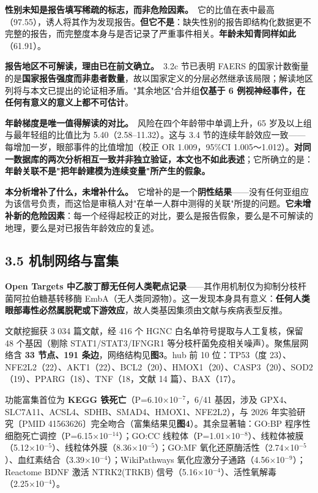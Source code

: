 \documentclass[UTF8,fontset=windows,11pt]{ctexart}
\begin{document}
\textbf{性别未知是报告填写稀疏的标志，而非危险因素。}\ 它的比值在表中最高（97.55），诱人将其作为发现报告。\textbf{但它不是}：缺失性别的报告即结构化数据更不完整的报告，而完整度本身与是否记录了严重事件相关。\textbf{年龄未知青同样如此}（61.91）。

\textbf{报告地区不可解读，理由已在前文确立。}\ 3.2c 节已表明 FAERS 的国家计数衡量的是\textbf{国家报告强度而非患者数量}，故以国家定义的分层必然继承该局限；解读地区列将与本文已提出的论证相矛盾。"其余地区"合并组\textbf{仅基于 6 例视神经事件，在任何有意义的意义上都不可估计}。

\textbf{年龄梯度是唯一值得解读的对比。}\ 风险在四个年龄带中单调上升，65 岁及以上组与最年轻组的比值比为 5.40（2.58–11.32）。这与 3.4 节的连续年龄效应一致——每增加一岁，眼部事件的比值增加（校正 OR 1.009，95\%CI 1.005～1.012）。\textbf{对同一数据库的两次分析相互一致并非独立验证，本文也不如此表述}；它所确立的是：\textbf{年龄关联不是"把年龄建模为连续变量"所产生的假象。}

\textbf{本分析增补了什么，未增补什么。}\ 它增补的是一个\textbf{阴性结果}——没有任何亚组应为该信号负责，而这恰是审稿人对"在单一人群中测得的关联"所提的问题。\textbf{它未增补新的危险因素}：每一个经得起校正的对比，要么是报告假象，要么是不可解读的地理，要么是对已报告年龄效应的复述。

\subsection{3.5 机制网络与富集}

\textbf{Open Targets 中乙胺丁醇无任何人类靶点记录}——其作用机制仅为抑制分枝杆菌阿拉伯糖基转移酶 EmbA（无人类同源物）。这一发现本身具有意义：\textbf{任何人类眼部毒性必然属脱靶或下游效应}，故人类基因集须由文献与疾病表型反推。

文献挖掘获 3 034 篇文献，经 416 个 HGNC 白名单符号提取与人工复核，保留 48 个基因（剔除 STAT1/STAT3/IFNGR1 等分枝杆菌免疫相关噪声）。聚焦层网络含 \textbf{33 节点、191 条边}，网络结构见\textbf{图3}。hub 前 10 位：TP53（度 23）、NFE2L2（22）、AKT1（22）、BCL2（20）、HMOX1（20）、CASP3（20）、SOD2（19）、PPARG（18）、TNF（18，文献 14 篇）、BAX（17）。

功能富集首位为 \textbf{KEGG 铁死亡}（P=6.10×10$^{-7}$，6/41 基因，涉及 GPX4、SLC7A11、ACSL4、SDHB、SMAD4、HMOX1、NFE2L2），与 2026 年实验研究〔PMID 41563626〕完全吻合（富集结果见\textbf{图4}）。其余显著轴：GO:BP 程序性细胞死亡调控（P=6.15×10$^{-14}$）；GO:CC 线粒体（P=1.01×10$^{-8}$）、线粒体被膜（5.12×10$^{-5}$）、线粒体外膜（8.36×10$^{-5}$）；GO:MF 氧化还原酶活性（2.74×10$^{-5}$）、血红素结合（3.39×10$^{-4}$）；WikiPathways 氧化应激分子通路（4.56×10$^{-9}$）；Reactome BDNF 激活 NTRK2(TRKB) 信号（5.16×10$^{-4}$）、活性氧解毒（2.25×10$^{-4}$）。
\end{document}
